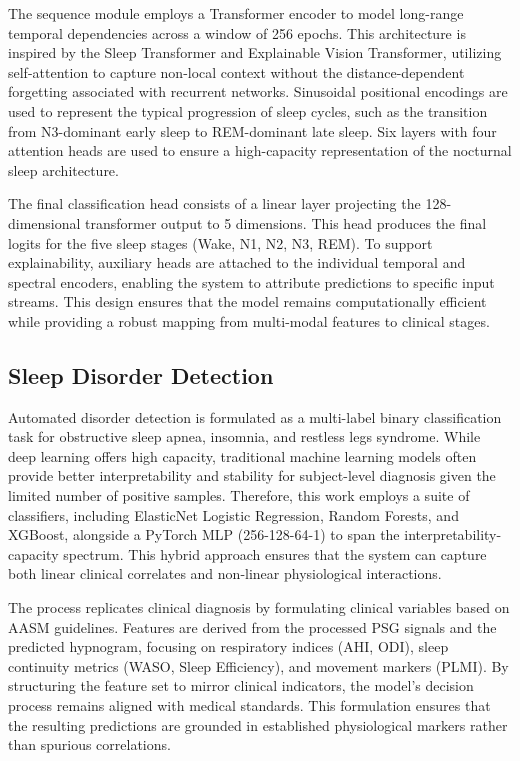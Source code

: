 \documentclass{ieeetj}
\begin{document}
The sequence module employs a Transformer encoder to model long-range temporal dependencies across a window of 256 epochs. This architecture is inspired by the Sleep Transformer and Explainable Vision Transformer, utilizing self-attention to capture non-local context without the distance-dependent forgetting associated with recurrent networks. Sinusoidal positional encodings are used to represent the typical progression of sleep cycles, such as the transition from N3-dominant early sleep to REM-dominant late sleep. Six layers with four attention heads are used to ensure a high-capacity representation of the nocturnal sleep architecture.

The final classification head consists of a linear layer projecting the 128-dimensional transformer output to 5 dimensions. This head produces the final logits for the five sleep stages (Wake, N1, N2, N3, REM). To support explainability, auxiliary heads are attached to the individual temporal and spectral encoders, enabling the system to attribute predictions to specific input streams. This design ensures that the model remains computationally efficient while providing a robust mapping from multi-modal features to clinical stages.

\subsection{Sleep Disorder Detection}
Automated disorder detection is formulated as a multi-label binary classification task for obstructive sleep apnea, insomnia, and restless legs syndrome. While deep learning offers high capacity, traditional machine learning models often provide better interpretability and stability for subject-level diagnosis given the limited number of positive samples. Therefore, this work employs a suite of classifiers, including ElasticNet Logistic Regression, Random Forests, and XGBoost, alongside a PyTorch MLP (256-128-64-1) to span the interpretability-capacity spectrum. This hybrid approach ensures that the system can capture both linear clinical correlates and non-linear physiological interactions.

The process replicates clinical diagnosis by formulating clinical variables based on AASM guidelines. Features are derived from the processed PSG signals and the predicted hypnogram, focusing on respiratory indices (AHI, ODI), sleep continuity metrics (WASO, Sleep Efficiency), and movement markers (PLMI). By structuring the feature set to mirror clinical indicators, the model's decision process remains aligned with medical standards. This formulation ensures that the resulting predictions are grounded in established physiological markers rather than spurious correlations.
\end{document}
